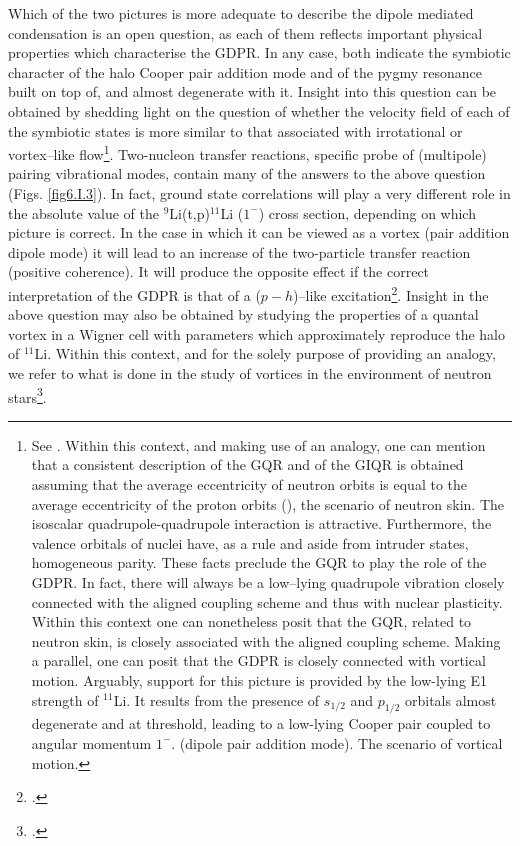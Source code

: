 \begin{subappendices}
Which of the two  pictures is more adequate to describe  the dipole mediated condensation is an open question,  
as each of them reflects  important physical properties which   characterise  the GDPR. In any case, both indicate the symbiotic character  of the halo Cooper pair  addition mode  and of the pygmy resonance  built on top of, and almost degenerate with it. 
Insight into this question can be obtained  by shedding light on the question  of whether  the velocity field of each of the symbiotic  states is more similar  to that associated  with irrotational or vortex--like flow\footnote{See \cite{Repko:13}. Within this context, and making use of an analogy, one can  mention that a consistent description of the GQR and of the GIQR is obtained 
assuming that the average eccentricity of neutron orbits 
is equal to the average eccentricity of the proton orbits (\cite{Bes:75c}), the scenario of neutron skin.
The  isoscalar quadrupole-quadrupole interaction is attractive. Furthermore, 
the valence orbitals of nuclei have, as a rule and aside from intruder states, homogeneous parity. These facts  preclude 
the GQR to play the role of the GDPR. In fact, there will always be a low--lying quadrupole vibration closely 
connected with the aligned coupling scheme and thus  with nuclear plasticity. Within this context one can  nonetheless  posit  that the GQR, related to neutron skin,  is closely associated with the aligned coupling scheme.
Making a parallel, one can posit  that the GDPR is closely connected with vortical motion. 
Arguably,  support for this picture is provided by the   low-lying  E1 
strength of $^{11}$Li. It  results from the presence of $s_{1/2}$ and $p_{1/2}$ orbitals almost degenerate and at threshold, 
leading to a low-lying Cooper pair coupled to angular momentum $1^-$. (dipole pair addition mode). 
The  scenario of vortical motion. }. Two-nucleon transfer reactions, specific probe  of (multipole) pairing vibrational modes, contain many of the answers to the above question (Figs. \ref{fig6.I.3}). 
In fact,  ground state correlations will play a very different role in the absolute value of the $^9$Li(t,p)$^{11}$Li ($1^-$) cross section,
depending  on which picture is correct. In the case in which 
it can be 
 viewed as a vortex (pair addition dipole mode) it will lead to an increase of the two-particle transfer reaction 
 (positive coherence).
 It will  produce the opposite effect if the correct interpretation of the GDPR   is that of a 
($p-h$)--like excitation\footnote{ \cite{Broglia:71}.}. 
Insight  in the above question may also be obtained by studying  the properties of
a quantal vortex in a Wigner cell with parameters which approximately reproduce 
the halo of $^{11}$Li. Within this context, and  for the solely purpose of providing an analogy, we refer 
to what is done in the study of vortices in the environment of neutron stars\footnote{\cite{Avogadro:07,Avogadro:08}.}.



\end{subappendices}
